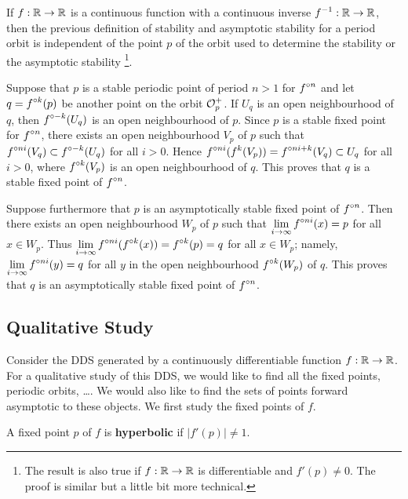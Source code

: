 \begin{rmk}
If $f:\mathbb{R}\to \mathbb{R}$ is a continuous function with a continuous inverse
$\displaystyle f^{-1}:\mathbb{R}\to \mathbb{R}$, then the previous definition of
stability and asymptotic stability for a period orbit is independent
of the point $p$ of the orbit used to determine the stability or the
asymptotic stability \footnote{The result is also true if
$f:\mathbb{R}\to \mathbb{R}$ is differentiable and $f'(p) \neq 0$.  The proof is
similar but a little bit more technical.}.

Suppose that $p$ is a stable periodic point of period $n>1$
for $\displaystyle f^{\circ n}$ and let $\displaystyle q=f^{\circ k}(p)$ be another
point on the orbit $\displaystyle \mathcal{O}_p^+$.
If $U_q$ is an open neighbourhood of $q$, then
$\displaystyle f^{\circ -k}(U_q)$ is an open neighbourhood of $p$.  Since
$p$ is a stable fixed point for $\displaystyle f^{\circ n}$, there exists an
open neighbourhood $V_p$ of $p$ such that
$\displaystyle f^{\circ ni}(V_q) \subset f^{\circ -k}(U_q)$ for all $i>0$. 
Hence $\displaystyle f^{\circ ni}(f^k(V_p)) = f^{\circ ni+k}(V_q) \subset U_q$
for all $i>0$, where $\displaystyle f^{\circ k}(V_p)$ is an open neighbourhood
of $q$.  This proves that $q$ is a stable fixed point of $\displaystyle f^{\circ n}$.

Suppose furthermore that $p$ is an asymptotically stable fixed point
of $\displaystyle f^{\circ n}$.  Then there exists an open neighbourhood $W_p$
of $p$ such that $\displaystyle \lim_{i\to \infty}f^{\circ ni}(x) = p$ for
all $x \in W_p$.  Thus
$\displaystyle \lim_{i\to \infty}f^{\circ ni}(f^{\circ k}(x)) = f^{\circ k}(p) = q$
for all $x \in W_p$; namely,
$\displaystyle \lim_{i\to \infty}f^{\circ ni}(y) = q$ for all
$y$ in the open neighbourhood $\displaystyle f^{\circ k}(W_p)$ of $q$.  This proves that
$q$ is an asymptotically stable fixed point of $\displaystyle f^{\circ n}$.
\end{rmk}

\subsection{Qualitative Study}

Consider the DDS generated by a continuously differentiable
function $f:\mathbb{R} \to \mathbb{R}$.  For a qualitative study of this DDS, we
would like to find all the fixed points, periodic orbits, \ldots.  We
would also like to find the sets of points forward asymptotic to these
objects.  We first study the fixed points of $f$.

\begin{defn}
A fixed point $p$ of $f$ is
{\bfseries hyperbolic} if
$\left|f'(p)\right| \neq 1$.
\end{defn}

